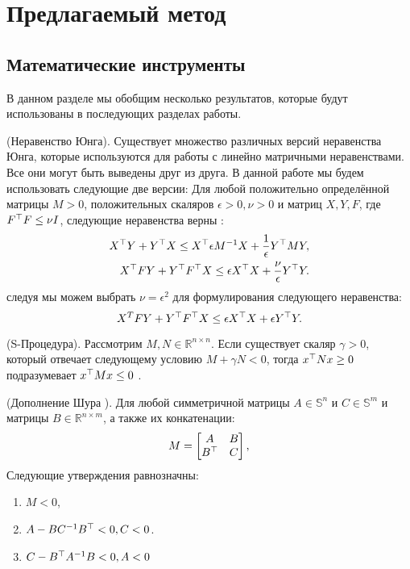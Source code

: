 \chapter{Предлагаемый метод}\label{ch:ch3}
\section{Математические инструменты}\label{sec:ch3/sect1}
В данном разделе мы обобщим несколько результатов, которые будут использованы в последующих разделах работы.
\begin{lemma}\label{lemma:Young}
	(Неравенство Юнга).
	Существует множество различных версий неравенства Юнга, которые используются для работы с линейно матричными неравенствами. Все они могут быть выведены друг из друга. В данной работе мы будем использовать следующие две версии:
	Для любой положительно определённой матрицы $M>0$, положительных скаляров $\epsilon > 0, \nu > 0$ и матриц ${X}, {Y}, {F}$, где ${F}^\top{F}\leq \nu{I}$, следующие неравенства верны \cite{BOYED1994}:
	\begin{align}
		\label{eq:Young_relation_BMI}
		{X}^\top{Y} + {Y}^\top{X}  \leq {X}^\top 
		\epsilon {M}^{-1}{X} + \frac{1}{\epsilon}   {Y}^\top  {M}{Y}, 
		\\
		\label{eq:Young_robust_2}
		{X}^\top{F}{Y} + {Y}^\top{F}^\top{X}  \leq \epsilon {X}^\top{X} +  \frac{\nu}{\epsilon} {Y}^\top {Y}.
	\end{align}
	следуя \cite{LIEN2008} мы можем выбрать $\nu=\epsilon^2$ для формулирования следующего неравенства:
	\begin{equation}
		\label{eq:updated_Young_robust_2}
		{X}^T{F}{Y} + {Y}^\top{F}^\top{X}  \leq \epsilon {X}^\top{X} + \epsilon {Y}^\top{Y}.
	\end{equation}
\end{lemma}

\begin{lemma}\label{lemma:S_procedure}
	(S-Процедура).
	Рассмотрим ${M},{N} \in \mathbb{R}^{n\times n}$. Если существует скаляр $\gamma>0$, который отвечает следующему условию ${M}+\gamma {N}<0$, тогда $x^\top {N} x\geq 0$ подразумевает $x^\top{M}x\leq 0$ \cite{BOYED1994}.
\end{lemma}

\begin{lemma}\label{lemma:Schur}
	(Дополнение Шура \cite{Schur}).
	Для любой симметричной матрицы ${A}\in \mathbb{S}^n$ и ${C}\in \mathbb{S}^m$ и матрицы ${B}\in \mathbb{R}^{n\times m}$, а также их конкатенации:
	\noindent \begin{align*}
		{M}= \begin{bmatrix}
			{A} & {B} \\
			{B}^\top & {C} 
		\end{bmatrix},
	\end{align*}
	Следующие утверждения равнозначны:
	\noindent
	\begin{enumerate}
		\item ${M} < 0$,
		\item ${A}-{B}{C}^{-1}{B}^\top < 0 , {C}< 0$.
		\item ${C}-{B}^\top{A}^{-1}{B}< 0 , {A}< 0$
	\end{enumerate}
\end{lemma}

